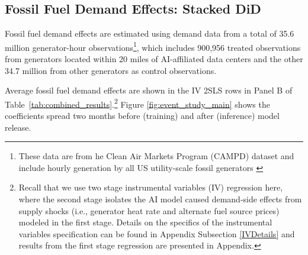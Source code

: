 \documentclass[sigconf,authordraft]{acmart}
\newcommand{\nb}[1]{\textcolor{blue}{NB[#1]}}
\begin{document}

\subsection{Fossil Fuel Demand Effects: Stacked DiD}
\label{subsec:fossil-fuel-demand-results}
 Fossil fuel demand effects are estimated using demand data from a total of 35.6 million generator-hour observations\footnote{These data are from he Clean Air Markets Program (CAMPD) dataset and include hourly generation by all US utility-scale fossil generators \cite{EPA_CAPMD_PowerSector2022}}, which includes 900,956 treated observations from generators located within 20 miles of AI-affiliated data centers and the other 34.7 million from other generators as control observations.



Average fossil fuel demand effects are shown in the IV 2SLS rows in Panel B of Table~\ref{tab:combined_results}.\footnote{Recall that we use two stage instrumental variables (IV) regression here, where the second stage isolates the AI model caused demand-side effects from supply shocks (i.e., generator heat rate and alternate fuel source prices) modeled in the first stage. Details on the specifics of the instrumental variables specification can be found in Appendix Subsection \ref{IVDetails} and results from the first stage regression are presented in Appendix.}  Figure \ref{fig:event_study_main} shows the coefficients spread two months before (training) and after (inference) model release.
\end{document}
